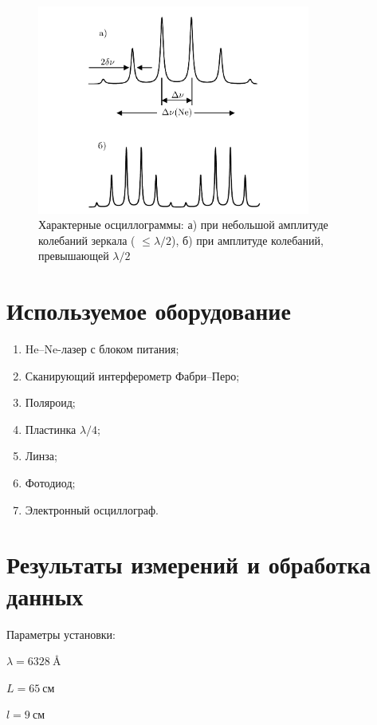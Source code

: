 \documentclass[a4paper, 12pt]{article}
\begin{document}
\begin{figure}[H]
	\centering
	\includegraphics[width=0.8\textwidth]{3.png}
	\caption{Характерные осциллограммы: а) при небольшой амплитуде колебаний зеркала \newline ( $\leqslant \lambda/2$), б) при амплитуде колебаний, превышающей $\lambda/2$}
	\label{fig:osc}
\end{figure}
 	
\section{Используемое оборудование}

\begin{enumerate}
    \item He--Ne-лазер с блоком питания;
    \item Сканирующий интерферометр Фабри--Перо;
    \item Поляроид;
    \item Пластинка $\lambda/4$;
    \item Линза;
    \item Фотодиод;
    \item Электронный осциллограф.
\end{enumerate}

\section{Результаты измерений и обработка данных}

Параметры установки:
\begin{description}
\item{} $\lambda =6328~\text{\AA}$
\item{} $L = 65~см$
\item{} $l = 9~см$
\end{description}
\end{document}

